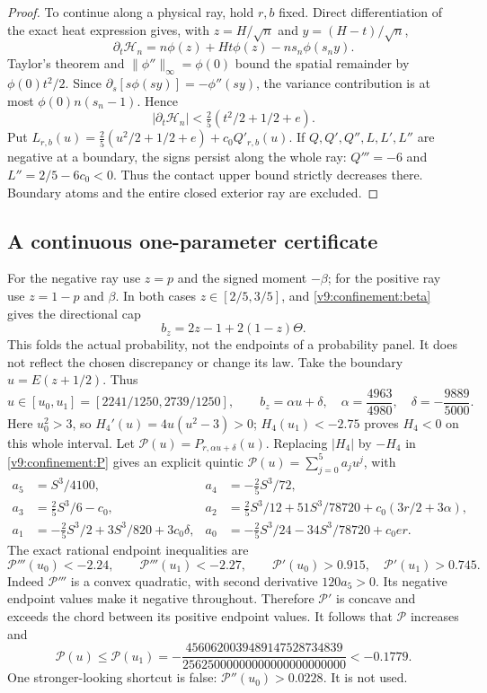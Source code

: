 \begin{proof}
To continue along a physical ray, hold $r,b$ fixed. Direct differentiation
of the exact heat expression gives, with $z=H/\sqrt n$ and
$y=(H-t)/\sqrt n$,
\[
 \partial_t\mathcal H_n=n\phi(z)+Ht\phi(z)-ns_n\phi(s_ny).
\]
Taylor's theorem and $\|\phi''\|_\infty=\phi(0)$ bound the spatial
remainder by $\phi(0)t^2/2$. Since
$\partial_s[s\phi(sy)]=-\phi''(sy)$, the variance contribution is at
most $\phi(0)n(s_n-1)$. Hence
\[
 |\partial_t\mathcal H_n|<\tfrac25(t^2/2+1/2+e).
\]
Put $L_{r,b}(u)=\tfrac25(u^2/2+1/2+e)+c_0Q'_{r,b}(u)$.
If $Q,Q',Q'',L,L',L''$ are negative at a boundary, the signs persist
along the whole ray: $Q'''=-6$ and $L''=2/5-6c_0<0$.
Thus the contact upper bound strictly decreases there. Boundary atoms
and the entire closed exterior ray are excluded.
\end{proof}

\subsection{A continuous one-parameter certificate}
For the negative ray use $z=p$ and the signed moment $-\beta$; for the
positive ray use $z=1-p$ and $\beta$. In both cases $z\in[2/5,3/5]$,
and \eqref{v9:confinement:beta} gives the directional cap
\[
 b_z=2z-1+2(1-z)\Theta.
\]
This folds the actual probability, not the endpoints of a probability
panel. It does not reflect the chosen discrepancy or change its law.
Take the boundary $u=E(z+1/2)$. Thus
\[
 u\in[u_0,u_1]=[2241/1250,2739/1250],\qquad
 b_z=\alpha u+\delta,
 \quad\alpha=\frac{4963}{4980},\quad\delta=-\frac{9889}{5000}.
\]
Here $u_0^2>3$, so $H_4'(u)=4u(u^2-3)>0$;
$H_4(u_1)<-2.75$ proves $H_4<0$ on this whole interval.
Let $\mathcal P(u)=P_{r,\alpha u+\delta}(u)$.
Replacing $|H_4|$ by $-H_4$ in \eqref{v9:confinement:P} gives an explicit quintic
$\mathcal P(u)=\sum_{j=0}^5 a_j u^j$, with
\begin{align*}
 a_5&=S^3/4100,& a_4&=-\tfrac25S^3/72,\\
 a_3&=\tfrac25S^3/6-c_0,&
 a_2&=\tfrac25S^3/12+51S^3/78720+c_0(3r/2+3\alpha),\\
 a_1&=-\tfrac25S^3/2+3S^3/820+3c_0\delta,&
 a_0&=-\tfrac25S^3/24-34S^3/78720+c_0er.
\end{align*}
The exact rational endpoint inequalities are
\[
 \mathcal P'''(u_0)<-2.24,\qquad \mathcal P'''(u_1)<-2.27,
 \qquad \mathcal P'(u_0)>0.915,\quad \mathcal P'(u_1)>0.745.
\]
Indeed $\mathcal P'''$ is a convex quadratic, with second derivative
$120a_5>0$. Its negative endpoint values make it negative throughout.
Therefore $\mathcal P'$ is concave and exceeds the chord between its
positive endpoint values. It follows that $\mathcal P$ increases and
\begin{equation}\label{v9:confinement:margin}
 \mathcal P(u)\le\mathcal P(u_1)
 =-\frac{4560620039489147528734839}{25625000000000000000000000}
 <-0.1779.
\end{equation}
One stronger-looking shortcut is false:
$\mathcal P''(u_0)>0.0228$. It is not used.


